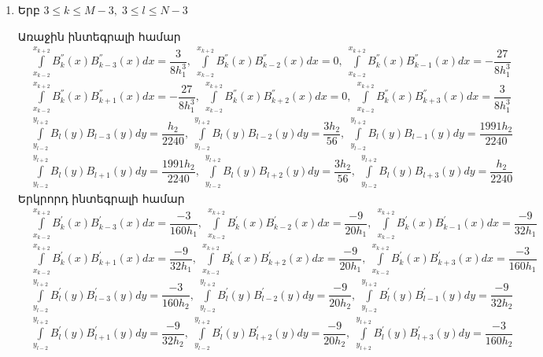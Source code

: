 \documentclass[fleqn, bachelor,subf,12pt,notitlepage]{article}
\begin{document}
\begin{enumerate}
\item{Երբ $3 \leq k \leq M-3, \; 3 \leq l \leq N-3$ }

Առաջին ինտեգրալի համար
\begin{equation}
\begin{aligned}
&\int \limits_{x_{k-2}}^{x_{k+2}}B_{k}^{''}(x)B_{k-3}^{''}(x)dx = \dfrac{3}{8h_{1}^3}, \; \int \limits_{x_{k-2}}^{x_{k+2}}B_{k}^{''}(x)B_{k-2}^{''}(x)dx = 0, \; \int \limits_{x_{k-2}}^{x_{k+2}}B_{k}^{''}(x)B_{k-1}^{''}(x)dx = -\dfrac{27}{8h_{1}^3} \\
&\int \limits_{x_{k-2}}^{x_{k+2}}B_{k}^{''}(x)B_{k+1}^{''}(x)dx =-\dfrac{27}{8h_{1}^3}, \; \int \limits_{x_{k-2}}^{x_{k+2}}B_{k}^{''}(x)B_{k+2}^{''}(x)dx = 0, \; \int \limits_{x_{k-2}}^{x_{k+2}}B_{k}^{''}(x)B_{k+3}^{''}(x)dx =  \dfrac{3}{8h_{1}^3} \\
&\int \limits_{y_{l-2}}^{y_{l+2}}B_{l}(y)B_{l-3}(y)dy=\dfrac{h_{2}}{2240}, \; \int \limits_{y_{l-2}}^{y_{l+2}}B_{l}(y)B_{l-2}(y)dy=\dfrac{3h_{2}}{56}, \; \int \limits_{y_{l-2}}^{y_{l+2}}B_{l}(y)B_{l-1}(y)dy=\dfrac{1991h_{2}}{2240} \\
&\int \limits_{y_{l-2}}^{y_{l+2}}B_{l}(y)B_{l+1}(y)dy=\dfrac{1991h_{2}}{2240}, \; \int \limits_{y_{l-2}}^{y_{l+2}}B_{l}(y)B_{l+2}(y)dy=\dfrac{3h_{2}}{56}, \; \int \limits_{y_{l-2}}^{y_{l+2}}B_{l}(y)B_{l+3}(y)dy=\dfrac{h_{2}}{2240}
\end{aligned}
\end{equation}
Երկրորդ ինտեգրալի համար
\begin{equation}
\begin{aligned}
&\int \limits_{x_{k-2}}^{x_{k+2}}B_{k}^{'}(x)B_{k-3}^{'}(x)dx=\dfrac{-3}{160h_{1}}, \; \int \limits_{x_{k-2}}^{x_{k+2}}B_{k}^{'}(x)B_{k-2}^{'}(x)dx=\dfrac{-9}{20h_{1}}, \; \int \limits_{x_{k-2}}^{x_{k+2}}B_{k}^{'}(x)B_{k-1}^{'}(x)dx=\dfrac{-9}{32h_{1}} \\
&\int \limits_{x_{k-2}}^{x_{k+2}}B_{k}^{'}(x)B_{k+1}^{'}(x)dx=\dfrac{-9}{32h_{1}}, \; \int \limits_{x_{k-2}}^{x_{k+2}}B_{k}^{'}(x)B_{k+2}^{'}(x)dx=\dfrac{-9}{20h_{1}}, \; \int \limits_{x_{k-2}}^{x_{k+2}}B_{k}^{'}(x)B_{k+3}^{'}(x)dx=\dfrac{-3}{160h_{1}} \\
&\int \limits_{y_{l-2}}^{y_{l+2}}B_{l}^{'}(y)B_{l-3}^{'}(y)dy=\dfrac{-3}{160h_{2}}, \; \int \limits_{y_{l-2}}^{y_{l+2}}B_{l}^{'}(y)B_{l-2}^{'}(y)dy=\dfrac{-9}{20h_{2}}, \; \int \limits_{y_{l-2}}^{y_{l+2}}B_{l}^{'}(y)B_{l-1}^{'}(y)dy=\dfrac{-9}{32h_{2}} \\
&\int \limits_{y_{l-2}}^{y_{l+2}}B_{l}^{'}(y)B_{l+1}^{'}(y)dy=\dfrac{-9}{32h_{2}}, \; \int \limits_{y_{l-2}}^{y_{l+2}}B_{l}^{'}(y)B_{l+2}^{'}(y)dy=\dfrac{-9}{20h_{2}}, \; \int \limits_{y_{l+2}}^{y_{l+2}}B_{l}^{'}(y)B_{l+3}^{'}(y)dy=\dfrac{-3}{160h_{2}}

\end{aligned}
\end{equation}
\end{enumerate}
\end{document}
